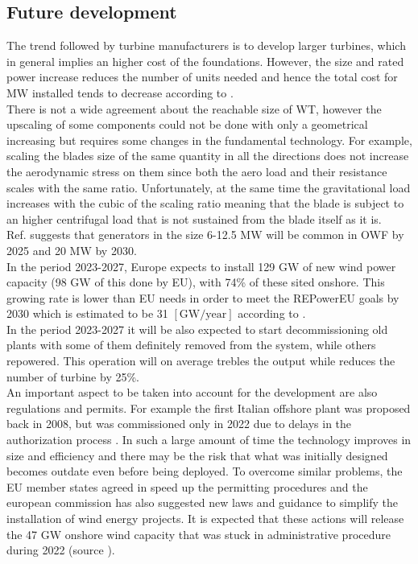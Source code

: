 \subsection{Future development}
The trend followed by turbine manufacturers is to develop larger turbines, which in general implies an higher cost of the foundations. However, the size and rated power increase reduces the number of units needed and hence the total cost for $\si{\mega\watt}$ installed tends to decrease according to \cite{current_staus_and_future_trends_of_offshore_wind_power_in_europe}.\\
There is not a wide agreement about the reachable size of WT, however the upscaling of some components could not be done with only a geometrical increasing but requires some changes in the fundamental technology. For example, scaling the blades size of the same quantity in all the directions does not increase the aerodynamic stress on them since both the aero load and their resistance scales with the same ratio. Unfortunately, at the same time the gravitational load increases with the cubic of the scaling ratio meaning that the blade is subject to an higher centrifugal load that is not sustained from the blade itself as it is. \\
Ref. \cite{current_staus_and_future_trends_of_offshore_wind_power_in_europe} suggests that generators in the size 6-12.5 $\si{\mega\watt}$ will be common in OWF by 2025 and 20 $\si{\mega\watt}$ by 2030.\\
In the period 2023-2027, Europe expects to install 129 $\si{\giga\watt}$ of new wind power capacity (98 $\si{\giga\watt}$ of this done by EU), with 74\% of these sited onshore. This growing rate is lower than EU needs in order to meet the REPowerEU goals by 2030 which is estimated to be 31 $\left[\text{GW/year}\right]$ according to \cite{wind_europe_data_2022}. \\
In the period 2023-2027 it will be also expected to start decommissioning old plants with some of them definitely removed from the system, while others repowered. This operation will on average trebles the output while reduces the number of turbine by 25\%. \\
An important aspect to be taken into account for the development are also regulations and permits. For example the first Italian offshore plant was proposed back in 2008, but was commissioned only in 2022 due to delays in the authorization process \cite{il_post}. In such a large amount of time the technology improves in size and efficiency and there may be the risk that what was initially designed becomes outdate even before being deployed. To overcome similar problems, the EU member states agreed in speed up the permitting procedures and the european commission has also suggested new laws and guidance to simplify the installation of wind energy projects. It is expected that these actions will release the 47 $\si{\giga\watt}$ onshore wind capacity that was stuck in administrative procedure during 2022 (source \cite{wind_europe_data_2022}).  